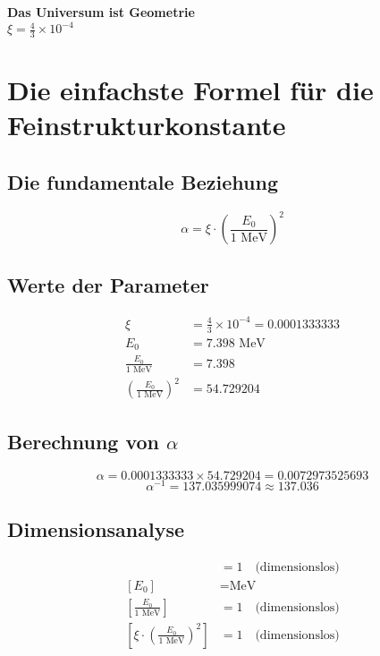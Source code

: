\documentclass[12pt,a4paper]{article}
\theoremstyle{definition}
\begin{document}
	\begin{center}
		\Large
		\textbf{Das Universum ist Geometrie}\\
		\vspace{1cm}
		\huge
		$\boxed{\xi = \frac{4}{3} \times 10^{-4}}$
	\end{center}
	\section*{Die einfachste Formel für die Feinstrukturkonstante}

\subsection*{Die fundamentale Beziehung}

\[
\boxed{\alpha = \xi \cdot \left(\frac{E_0}{1 \text{ MeV}}\right)^2}
\]

\subsection*{Werte der Parameter}

\begin{align*}
	\xi &= \frac{4}{3} \times 10^{-4} = 0.0001333333 \\
	E_0 &= 7.398 \text{ MeV} \\
	\frac{E_0}{1 \text{ MeV}} &= 7.398 \\
	\left(\frac{E_0}{1 \text{ MeV}}\right)^2 &= 54.729204
\end{align*}

\subsection*{Berechnung von $\alpha$}

\[
\alpha = 0.0001333333 \times 54.729204 = 0.0072973525693
\]
\[
\alpha^{-1} = 137.035999074 \approx 137.036
\]

\subsection*{Dimensionsanalyse}

\begin{align*}
	[\xi] &= 1 \quad \text{(dimensionslos)} \\
	[E_0] &= \text{MeV} \\
	\left[\frac{E_0}{1 \text{ MeV}}\right] &= 1 \quad \text{(dimensionslos)} \\
	\left[\xi \cdot \left(\frac{E_0}{1 \text{ MeV}}\right)^2\right] &= 1 \quad \text{(dimensionslos)}
\end{align*}
\end{document}
